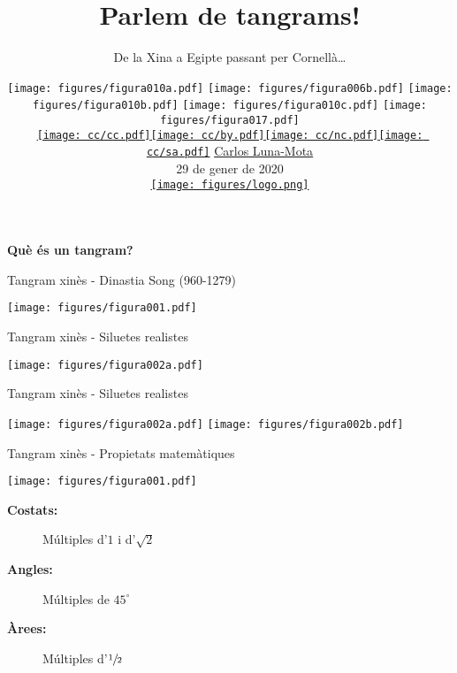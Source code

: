 \documentclass[14pt]{beamer}
\title{Parlem de tangrams!}
\subtitle{De la Xina a Egipte passant per Cornellà\ldots}
\author{
    \texttt{[image: figures/figura010a.pdf]} \texttt{[image: figures/figura006b.pdf]} \texttt{[image: figures/figura010b.pdf]} \texttt{[image: figures/figura010c.pdf]} \texttt{[image: figures/figura017.pdf]}\\
    \vspace{1.5em}
    \href{https://creativecommons.org/licenses/by-nc-sa/4.0/}{\texttt{[image: cc/cc.pdf]}\texttt{[image: cc/by.pdf]}\texttt{[image: cc/nc.pdf]}\texttt{[image: cc/sa.pdf]}} \href{https://github.com/CarlosLunaMota}{Carlos Luna-Mota} \\
    29 de gener de 2020 \\
    \vspace{0.75em}
    \href{https://mmaca.cat/}{\texttt{[image: figures/logo.png]}}}
\begin{document}
    \begin{frame}
      \titlepage
    \end{frame}


    \begin{frame}{}
        \begin{center}
            \textbf{\huge Què és un tangram?}\\
        \end{center}
    \end{frame}


    \begin{frame}{Tangram xinès - Dinastia Song (960-1279)}
        \begin{center}
            \texttt{[image: figures/figura001.pdf]} \\
        \end{center}
    \end{frame}

    \begin{frame}{Tangram xinès - Siluetes realistes}
        \begin{center}
            \texttt{[image: figures/figura002a.pdf]} \quad {} \\
        \end{center}
    \end{frame}

    \begin{frame}{Tangram xinès - Siluetes realistes}
        \begin{center}
            \texttt{[image: figures/figura002a.pdf]} \quad \texttt{[image: figures/figura002b.pdf]} \\
        \end{center}
    \end{frame}


    \begin{frame}{Tangram xinès - Propietats matemàtiques}
        \begin{center}
            \texttt{[image: figures/figura001.pdf]} \\

            \bigskip
            
            \begin{minipage}{0.6\textwidth}
                \begin{description}
                    \item[\textbf{Costats:}] Múltiples d'$1$ i d'$\sqrt{2}$
                    \item[\textbf{Angles:}]  Múltiples de $45^\circ$
                    \item[\textbf{Àrees:}]   Múltiples d'$\sfrac{1}{2}$
                \end{description}
            \end{minipage}
        \end{center}
    \end{frame}
\end{document}
